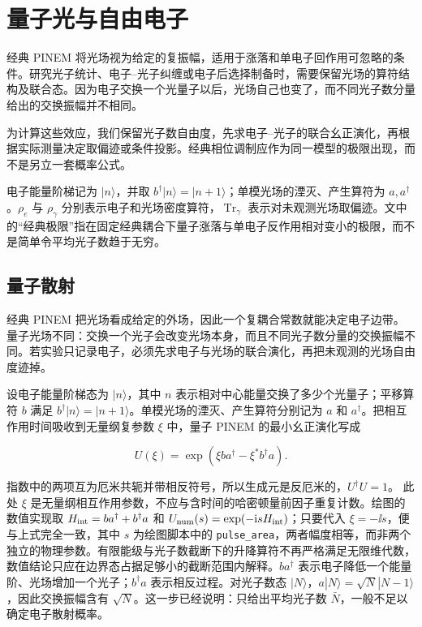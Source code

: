 \chapter{量子光与自由电子}

经典 PINEM 将光场视为给定的复振幅，适用于涨落和单电子回作用可忽略的条件。研究光子统计、电子--光子纠缠或电子后选择制备时，需要保留光场的算符结构及联合态。因为电子交换一个光量子以后，光场自己也变了，而不同光子数分量给出的交换振幅并不相同。

为计算这些效应，我们保留光子数自由度，先求电子--光子的联合幺正演化，再根据实际测量决定取偏迹或条件投影。经典相位调制应作为同一模型的极限出现，而不是另立一套概率公式。

电子能量阶梯记为 $|n\rangle$，并取 $b^\dagger|n\rangle=|n+1\rangle$；单模光场的湮灭、产生算符为 $a,a^\dagger$。$\rho_e$ 与 $\rho_\gamma$ 分别表示电子和光场密度算符，$\operatorname{Tr}_\gamma$ 表示对未观测光场取偏迹。文中的“经典极限”指在固定经典耦合下量子涨落与单电子反作用相对变小的极限，而不是简单令平均光子数趋于无穷。


\section{量子散射}
经典 PINEM 把光场看成给定的外场，因此一个复耦合常数就能决定电子边带。量子光场不同：交换一个光子会改变光场本身，而且不同光子数分量的交换振幅不同。若实验只记录电子，必须先求电子与光场的联合演化，再把未观测的光场自由度迹掉。

设电子能量阶梯态为 $|n\rangle$，其中 $n$ 表示相对中心能量交换了多少个光量子；平移算符 $b$ 满足 $b^\dagger|n\rangle=|n+1\rangle$。单模光场的湮灭、产生算符分别记为 $a$ 和 $a^\dagger$。把相互作用时间吸收到无量纲复参数 $\xi$ 中，量子 PINEM 的最小幺正演化写成

\begin{equation}
U(\xi)=\exp\!\left(\xi b a^\dagger-\xi^*b^\dagger a\right).
\label{eq:ch04-1}
\end{equation}

指数中的两项互为厄米共轭并带相反符号，所以生成元是反厄米的，$U^\dagger U=1$。 此处 $\xi$ 是无量纲相互作用参数，不应与含时间的哈密顿量前因子重复计数。绘图的数值实现取 $H_{\rm int}=b a^\dagger+b^\dagger a$ 和 $U_{\rm num}(s)=\exp(-\mathrm{i} sH_{\rm int})$；只要代入 $\xi=-\ii s$，便与上式完全一致，其中 $s$ 为绘图脚本中的 \texttt{pulse\_area}，两者幅度相等，而非两个独立的物理参数。有限能级与光子数截断下的升降算符不再严格满足无限维代数，数值结论只应在边界态占据足够小的截断范围内解释。$b a^\dagger$ 表示电子降低一个能量阶、光场增加一个光子；$b^\dagger a$ 表示相反过程。对光子数态 $|N\rangle$，$a|N\rangle=\sqrt N|N-1\rangle$，因此交换振幅含有 $\sqrt N$。这一步已经说明：只给出平均光子数 $\bar N$，一般不足以确定电子散射概率。

